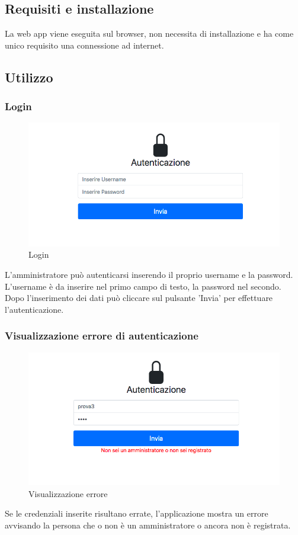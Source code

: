 \subsection{Requisiti e installazione}
La web app viene eseguita sul browser, non necessita di installazione e ha come unico requisito una connessione ad internet.

\subsection{Utilizzo}
\subsubsection{Login}
\begin{figure}[H]
	\centering
	\includegraphics[width=15cm]{res/images/login.jpg}
	\caption{Login}
\end{figure}
L'amministratore può autenticarsi inserendo il proprio username e la password. L’username è da inserire nel primo campo di testo, la password nel secondo. Dopo l’inserimento dei dati può cliccare sul pulsante 'Invia' per effettuare l'autenticazione.

\subsubsection{Visualizzazione errore di autenticazione}
\begin{figure}[H]
	\centering
	\includegraphics[width=15cm]{res/images/error.png}
	\caption{Visualizzazione errore}
\end{figure}
Se le credenziali inserite risultano errate, l’applicazione mostra un errore avvisando la persona che o non è un amministratore o ancora non è registrata.

